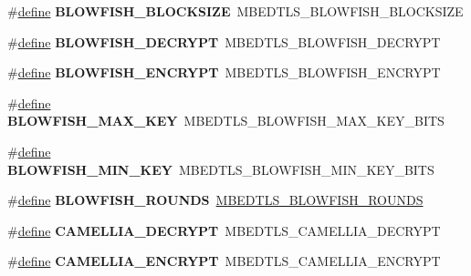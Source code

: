 \begin{DoxyCompactItemize}
\#\hyperlink{structdefine}{define} {\bfseries B\+L\+O\+W\+F\+I\+S\+H\+\_\+\+B\+L\+O\+C\+K\+S\+I\+ZE}~M\+B\+E\+D\+T\+L\+S\+\_\+\+B\+L\+O\+W\+F\+I\+S\+H\+\_\+\+B\+L\+O\+C\+K\+S\+I\+ZE
\item 
\mbox{\label{compat-1_83_8h_aef79827b2885cff8b753e01521552942}} 
\#\hyperlink{structdefine}{define} {\bfseries B\+L\+O\+W\+F\+I\+S\+H\+\_\+\+D\+E\+C\+R\+Y\+PT}~M\+B\+E\+D\+T\+L\+S\+\_\+\+B\+L\+O\+W\+F\+I\+S\+H\+\_\+\+D\+E\+C\+R\+Y\+PT
\item 
\mbox{\label{compat-1_83_8h_a08181b24dc6716d2ce995653d1bf9263}} 
\#\hyperlink{structdefine}{define} {\bfseries B\+L\+O\+W\+F\+I\+S\+H\+\_\+\+E\+N\+C\+R\+Y\+PT}~M\+B\+E\+D\+T\+L\+S\+\_\+\+B\+L\+O\+W\+F\+I\+S\+H\+\_\+\+E\+N\+C\+R\+Y\+PT
\item 
\mbox{\label{compat-1_83_8h_a9b3eef52032f51fd010a59d1265e644c}} 
\#\hyperlink{structdefine}{define} {\bfseries B\+L\+O\+W\+F\+I\+S\+H\+\_\+\+M\+A\+X\+\_\+\+K\+EY}~M\+B\+E\+D\+T\+L\+S\+\_\+\+B\+L\+O\+W\+F\+I\+S\+H\+\_\+\+M\+A\+X\+\_\+\+K\+E\+Y\+\_\+\+B\+I\+TS
\item 
\mbox{\label{compat-1_83_8h_a751816537f868b47b91f4c1f448dc2ea}} 
\#\hyperlink{structdefine}{define} {\bfseries B\+L\+O\+W\+F\+I\+S\+H\+\_\+\+M\+I\+N\+\_\+\+K\+EY}~M\+B\+E\+D\+T\+L\+S\+\_\+\+B\+L\+O\+W\+F\+I\+S\+H\+\_\+\+M\+I\+N\+\_\+\+K\+E\+Y\+\_\+\+B\+I\+TS
\item 
\mbox{\label{compat-1_83_8h_a4dd158a68247e4a094f9bb607c62b131}} 
\#\hyperlink{structdefine}{define} {\bfseries B\+L\+O\+W\+F\+I\+S\+H\+\_\+\+R\+O\+U\+N\+DS}~\hyperlink{blowfish_8h_a9a9858208f44ea332105fcb68ef93f06}{M\+B\+E\+D\+T\+L\+S\+\_\+\+B\+L\+O\+W\+F\+I\+S\+H\+\_\+\+R\+O\+U\+N\+DS}
\item 
\mbox{\label{compat-1_83_8h_a1f0130ae5c96dd542e1d1d9e87d7f529}} 
\#\hyperlink{structdefine}{define} {\bfseries C\+A\+M\+E\+L\+L\+I\+A\+\_\+\+D\+E\+C\+R\+Y\+PT}~M\+B\+E\+D\+T\+L\+S\+\_\+\+C\+A\+M\+E\+L\+L\+I\+A\+\_\+\+D\+E\+C\+R\+Y\+PT
\item 
\mbox{\label{compat-1_83_8h_aeac0ba1b8a0caa424d8c33b7d616a758}} 
\#\hyperlink{structdefine}{define} {\bfseries C\+A\+M\+E\+L\+L\+I\+A\+\_\+\+E\+N\+C\+R\+Y\+PT}~M\+B\+E\+D\+T\+L\+S\+\_\+\+C\+A\+M\+E\+L\+L\+I\+A\+\_\+\+E\+N\+C\+R\+Y\+PT

\end{DoxyCompactItemize}
